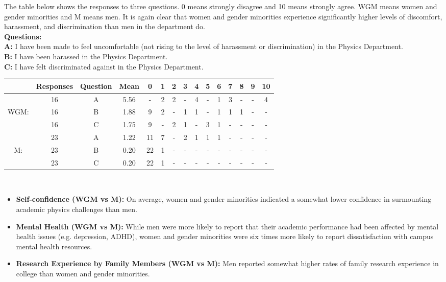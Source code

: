 \documentclass[oneside]{book}   %
\begin{document}
The table below shows the responses to three questions. 0 means strongly disagree and 10 means strongly agree. WGM means women and gender minorities and M means men. It is again clear that women and gender minorities experience significantly higher levels of discomfort, harassment, and discrimination than men in the department do.\\
\textbf{Questions:}\\
\noindent \textbf{A:} I have been made to feel uncomfortable (not rising to the level of harassment or discrimination) in the Physics Department.\\
\noindent \textbf{B:} I have been harassed in the Physics Department.\\
\noindent \textbf{C:} I have felt discriminated against in the Physics Department.\\

\noindent\begin{tabular}{cccc|ccccccccccc}
  & Responses & Question & Mean & 0 & 1 & 2 & 3 & 4 & 5 & 6 & 7 & 8 & 9 & 10\\
\hline
 & 16 & A & 5.56 & - & 2 & 2 & - & 4 & - & 1 & 3 & - & - & 4 \\
WGM: & 16 & B & 1.88 & 9 & 2 & - & 1 & 1 & - & 1 & 1 & 1 & - & - \\
 & 16 & C & 1.75 & 9 & - & 2 & 1 & - & 3 & 1 & - & - & - & - \\
\hline
 & 23 & A & 1.22 & 11 & 7 & - & 2 & 1 & 1 & 1 & - & - & - & - \\
M: & 23 & B & 0.20 &22 & 1 & - & - & - & - & - & - & - & - & - \\
 & 23 & C & 0.20 & 22 & 1 & - & - & - & - & - & - & - & - & - \\
\hline
\end{tabular}
\\

\begin{itemize}

	\item\textbf{Self-confidence (WGM vs M):} On average, women and gender minorities indicated a somewhat lower confidence in surmounting academic physics challenges than men.

	\item\textbf{Mental Health (WGM vs M):} While men were more likely to report that their academic performance had been affected by mental health issues (e.g. depression, ADHD), women and gender minorities were six times more likely to report dissatisfaction with campus mental health resources.

	\item\textbf{Research Experience by Family Members (WGM vs M):} Men reported somewhat higher rates of family research experience in college than women and gender minorities.
\end{itemize}
\end{document}
